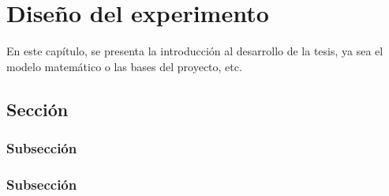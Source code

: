 

\chapter{Diseño del experimento}
En este capítulo, se presenta la introducción al desarrollo de la tesis, ya sea el modelo matemático o las bases del proyecto, etc.

\section{Sección}
    \subsection{Subsección}
        \blindtext
        
\subsection{Subsección}
    \Blindtext
